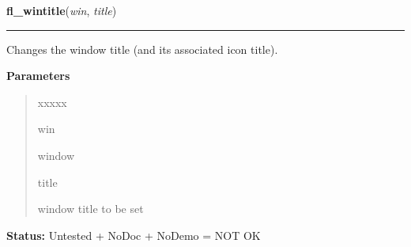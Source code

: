 \hspace{.8\funcindent}\begin{boxedminipage}{\funcwidth}

    \raggedright \textbf{fl\_wintitle}(\textit{win}, \textit{title})

    \vspace{-1.5ex}

    \rule{\textwidth}{0.5\fboxrule}
\setlength{\parskip}{2ex}
    Changes the window title (and its associated icon title).

\setlength{\parskip}{1ex}
      \textbf{Parameters}
      \vspace{-1ex}

      \begin{quote}
        \begin{Ventry}{xxxxx}

          \item[win]

          window

          \item[title]

          window title to be set

        \end{Ventry}

      \end{quote}

\textbf{Status:} Untested + NoDoc + NoDemo = NOT OK



    \end{boxedminipage}

    \label{xformslib:library:fl_winicontitle}

    \vspace{0.5ex}

